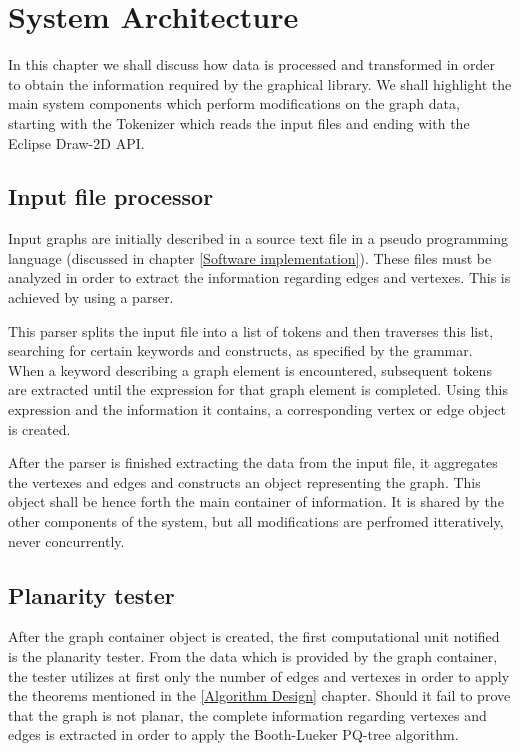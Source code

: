 \chapter{System Architecture}

In this chapter we shall discuss how data is processed and transformed in order to obtain 
the information required by the graphical library. We shall highlight the main system components 
which perform modifications on the graph data, starting with the Tokenizer which reads the input 
files and ending with the Eclipse Draw-2D API.

\section{Input file processor}

Input graphs are initially described in a source text file in a pseudo programming language (discussed in 
chapter \ref{Software implementation}). These files must be analyzed in order to extract the information 
regarding edges and vertexes. This is achieved by using a parser.

This parser splits the input file into a list of tokens and then traverses this list, searching for certain 
keywords and constructs, as specified by the grammar. When a keyword describing a graph element is encountered, 
subsequent tokens are extracted until the expression for that graph element is completed. Using this expression 
and the information it contains, a corresponding vertex or edge object is created.

After the parser is finished extracting the data from the input file, it aggregates the vertexes and 
edges and constructs an object representing the graph. This object shall be hence forth the main container 
of information. It is shared by the other components of the system, but all modifications are perfromed 
itteratively, never concurrently.

\section{Planarity tester}

After the graph container object is created, the first computational unit notified is the planarity tester. 
From the data which is provided by the graph container, the tester utilizes at first only the number of edges 
and vertexes in order to apply the theorems mentioned in the \ref{Algorithm Design} chapter. Should it fail 
to prove that the graph is not planar, the complete information regarding vertexes and edges is extracted 
in order to apply the Booth-Lueker PQ-tree algorithm.

